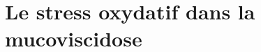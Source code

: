 \cleardoublepage %



\ctparttext{} %

\part{Le stress oxydatif dans la mucoviscidose} %











\appendix
{}


